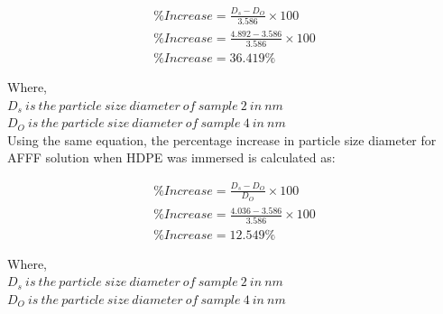 \documentclass[12pt]{report}
\begin{document}
\begin{gather}
    \%Increase = \frac{D_s - D_O}{3.586} \times 100 \\ 
    \nonumber \%Increase = \frac{4.892 - 3.586}{3.586}\times 100 \\
    \nonumber \%Increase = 36.419\%
    \label{ch5:equation:stainless_steel}
\end{gather}

Where, \\
$D_s\ is\ the\ particle\ size\ diameter\ of\ sample\ 2\ in\ nm$ \\
$D_O\ is\ the\ particle\ size\ diameter\ of\ sample\ 4\ in\ nm$ \\

Using the same equation, the percentage increase in particle size diameter for AFFF solution when HDPE was immersed is calculated as:  

\begin{gather}
    \%Increase = \frac{D_s - D_O}{D_O} \times 100 \\ 
    \nonumber \%Increase = \frac{4.036 - 3.586}{3.586}\times 100 \\
    \nonumber \%Increase = 12.549\% 
    \label{ch5:equation:hdpe}
\end{gather}
 
Where, \\
$D_s\ is\ the\ particle\ size\ diameter\ of\ sample\ 2\ in\ nm$ \\
$D_O\ is\ the\ particle\ size\ diameter\ of\ sample\ 4\ in\ nm$ \\
\end{document}
